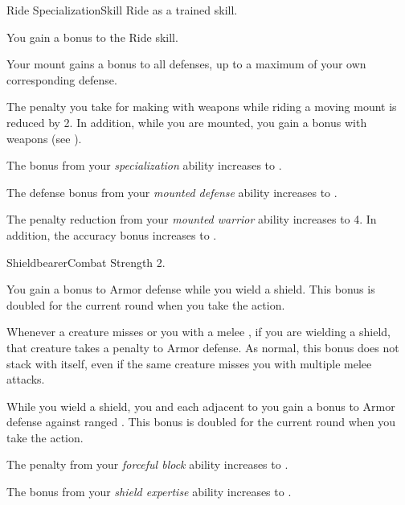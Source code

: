   \begin{feat}{Ride Specialization}{Skill}
    \featpre Ride as a trained skill.

     You gain a  bonus to the Ride skill.

     Your mount gains a  bonus to all defenses, up to a maximum of your own corresponding defense.

     The penalty you take for making  with  weapons while riding a moving mount is reduced by 2.
    In addition, while you are mounted, you gain a   bonus with  weapons (see ).

     The bonus from your \textit{specialization} ability increases to .

     The defense bonus from your \textit{mounted defense} ability increases to .

     The penalty reduction from your \textit{mounted warrior} ability increases to 4.
    In addition, the accuracy bonus increases to .
  \end{feat}

  \begin{feat}{Shieldbearer}{Combat}
    \featpre Strength 2.

     You gain a  bonus to Armor defense while you wield a shield.
    This bonus is doubled for the current round when you take the  action.

     Whenever a creature misses or  you with a melee , if you are wielding a shield, that creature  takes a  penalty to Armor defense.
    As normal, this bonus does not stack with itself, even if the same creature misses you with multiple melee attacks.

     While you wield a shield, you and each  adjacent to you gain a  bonus to Armor defense against ranged .
    This bonus is doubled for the current round when you take the  action.

     The penalty from your \textit{forceful block} ability increases to .

     The bonus from your \textit{shield expertise} ability increases to .
  \end{feat}

